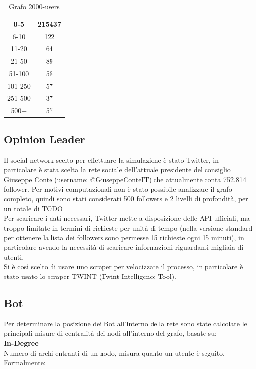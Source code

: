     \begin{table}[h!]
    \begin{tabular}{ |c|c| }
     \hline
     0-5 & 215437 \\
     \hline
     6-10 & 122 \\
     \hline
     11-20 & 64 \\
     \hline
     21-50 & 89 \\
     \hline
     51-100 & 58 \\
     \hline
     101-250 & 57 \\
     \hline
     251-500 & 37 \\
     \hline
     500+ & 57 \\
     \hline
    \end{tabular}
    \caption{Grafo 2000-users}
    \end{table}
    \subsection{Opinion Leader}
    Il social network scelto per effettuare la simulazione è stato Twitter, in particolare è stata scelta la rete sociale dell’attuale presidente del consiglio Giuseppe Conte (username: @GiuseppeConteIT\cite{twitterGiuseppeConte}) che attualmente conta 752.814 follower. Per motivi computazionali non è stato possibile analizzare il grafo completo, quindi sono stati considerati 500 followers e 2 livelli di profondità, per un totale di TODO \\
    Per scaricare i dati necessari, Twitter mette a disposizione delle API ufficiali, ma troppo limitate in termini di richieste per unità di tempo (nella versione standard per ottenere la lista dei followers sono permesse 15 richieste ogni 15 minuti), in particolare avendo la necessità di scaricare informazioni riguardanti migliaia di utenti.\\
    Si è così scelto di usare uno scraper per velocizzare il processo, in particolare è stato usato lo scraper TWINT\cite{Twint} (Twint Intelligence Tool).
    \subsection{Bot}\label{Bot}
    Per determinare la posizione dei Bot all'interno della rete sono state calcolate le principali misure di centralità dei nodi all'interno del grafo, basate su:
    \\
    \textbf{In-Degree}
    \\
    Numero di archi entranti di un nodo, misura quanto un utente è seguito.\\
    Formalmente:

